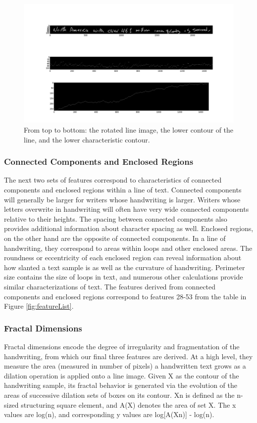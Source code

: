 \documentclass[paper=a4, fontsize=11pt]{scrartcl} %
\numberwithin{equation}{section} %
\numberwithin{figure}{section} %
\numberwithin{table}{section} %
\begin{document}
\begin{figure}
  \centering \includegraphics{contourimage.png}
  \caption{From top to bottom: the rotated line image, the lower
    contour of the line, and the lower characteristic contour.}
  \label{fig:contourimage}
\end{figure}

\subsubsection{Connected Components and Enclosed Regions}
The next two sets of features correspond to characteristics of
connected components and enclosed regions within a line of
text. Connected components will generally be larger for writers whose
handwriting is larger. Writers whose letters overwrite in handwriting
will often have very wide connected components relative to their
heights. The spacing between connected components also provides
additional information about character spacing as well. Enclosed
regions, on the other hand are the opposite of connected
components. In a line of handwriting, they correspond to areas within
loops and other enclosed areas. The roundness or eccentricity of each
enclosed region can reveal information about how slanted a text sample
is as well as the curvature of handwriting. Perimeter size contains
the size of loops in text, and numerous other calculations provide
similar characterizations of text. The features derived from connected
components and enclosed regions correspond to features 28-53 from the
table in Figure \ref{fig:featureList}.

\subsubsection{Fractal Dimensions}
Fractal dimensions encode the degree of irregularity and fragmentation
of the handwriting, from which our final three features are
derived\cite{FractalDimensions}. At a high level, they measure the
area (measured in number of pixels) a handwritten text grows as a
dilation operation is applied onto a line image. Given X as the
contour of the handwriting sample, its fractal behavior is generated
via the evolution of the areas of successive dilation sets of boxes on
its contour. Xn is defined as the n-sized structuring square element,
and A(X) denotes the area of set X. The x values are log(n), and
corresponding y values are log[A(Xn)] - log(n).
\end{document}
